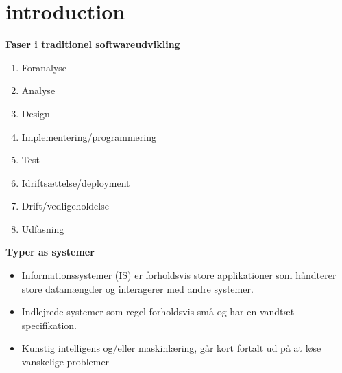 \section{introduction}

\textbf{Faser i traditionel softwareudvikling}
\begin{enumerate}
	\item{Foranalyse}
	\item{Analyse}
	\item{Design}
	\item{Implementering/programmering}
	\item{Test}
	\item{Idriftsættelse/deployment}
	\item{Drift/vedligeholdelse}
	\item{Udfasning}

\end{enumerate}

\textbf{Typer as systemer}

\begin{itemize}
	\item{Informationssystemer (IS) er forholdsvis store applikationer som håndterer store datamængder
	            og interagerer med andre systemer.}
	\item{Indlejrede systemer som regel forholdsvis små og har en vandtæt specifikation.}
	\item{Kunstig intelligens og/eller maskinlæring, går kort fortalt ud på at
	            løse vanskelige problemer}
\end{itemize}


